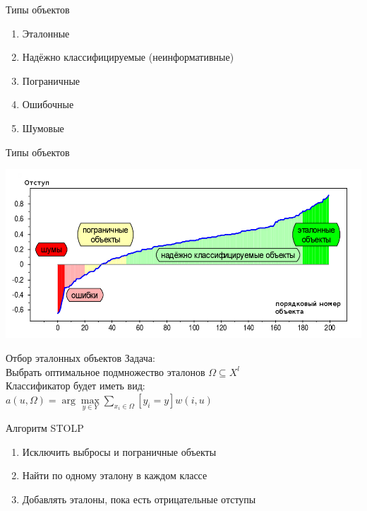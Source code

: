 \documentclass[10pt]{beamer}
\begin{document}
\begin{frame}{Типы объектов}
	\begin{enumerate}
		\item Эталонные
		\item Надёжно классифицируемые (неинформативные)
		\item Пограничные	
		\item Ошибочные	
		\item Шумовые	
	\end{enumerate}
\end{frame}

{
\begin{frame}{Типы объектов}
  \begin{center}
    \includegraphics[width=\textwidth, keepaspectratio]{images/margin}
  \end{center}
\end{frame}
}

\begin{frame}{Отбор эталонных объектов}
	\alert{Задача}:\\
	Выбрать оптимальное подмножество эталонов $\Omega\subseteq X^l$\\ 
    \bigbreak
	Классификатор будет иметь вид:\\
	${a(u, \Omega) = \arg\max\limits_{y \in Y} \sum\limits_{x_i \in \Omega} [y_i = y]w(i, u) }$\\
\end{frame}

\begin{frame}{Алгоритм STOLP}
	\begin{enumerate}
		\item Исключить выбросы и пограничные объекты
		\item Найти по одному эталону в каждом классе
		\item Добавлять эталоны, пока есть отрицательные отступы	
	\end{enumerate}
\end{frame}
\end{document}
